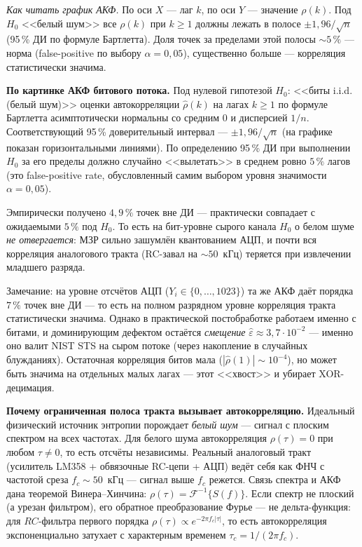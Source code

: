 \documentclass[12pt,a4paper]{extarticle}
\begin{document}
{\emph{Как читать график АКФ.} По оси $X$ --- лаг $k$, по оси $Y$ ---
значение $\rho(k)$. Под $H_0$ <<белый шум>> все $\rho(k)$ при $k\ge 1$
должны лежать в полосе $\pm 1{,}96/\sqrt{n}$ (95\,\% ДИ по формуле
Бартлетта). Доля точек за пределами этой полосы $\sim 5\,\%$ --- норма
(false-positive по выбору $\alpha=0{,}05$), существенно больше ---
корреляция статистически значима.

\medskip
\textbf{По картинке АКФ битового потока.}
Под нулевой гипотезой $H_0$: <<биты i.i.d.\,(белый шум)>> оценки
автокорреляции $\hat\rho(k)$ на лагах $k\ge 1$ по формуле Бартлетта
асимптотически нормальны со средним $0$ и дисперсией $1/n$.
Соответствующий 95\,\% доверительный интервал ---
$\pm 1{,}96/\sqrt{n}$ (на графике показан горизонтальными линиями).
По определению 95\,\% ДИ при выполнении $H_0$ за его пределы
должно случайно <<вылетать>> в среднем ровно $5\,\%$ лагов
(это false-positive rate, обусловленный самим выбором уровня
значимости $\alpha = 0{,}05$).

Эмпирически получено $4{,}9\,\%$ точек вне ДИ --- практически совпадает с
ожидаемыми $5\,\%$ под $H_0$. То есть на бит-уровне сырого канала $H_0$ о
белом шуме \emph{не отвергается}: МЗР сильно зашумлён квантованием АЦП, и
почти вся корреляция аналогового тракта (RC-завал на $\sim\!50$~кГц)
теряется при извлечении младшего разряда.

\medskip
Замечание: на уровне отсчётов АЦП ($Y_i\in\{0,\ldots,1023\}$) та же АКФ даёт
порядка $7\,\%$ точек вне ДИ --- то есть на полном разрядном уровне
корреляция тракта статистически значима. Однако в практической постобработке
работаем именно с битами, и доминирующим дефектом остаётся \emph{смещение}
$\hat\varepsilon\approx 3{,}7\cdot 10^{-2}$ --- именно оно валит NIST STS на
сыром потоке (через накопление в случайных блужданиях). Остаточная
корреляция битов мала ($|\hat\rho(1)|\sim 10^{-4}$), но может быть значима
на отдельных малых лагах --- этот <<хвост>> и убирает XOR-децимация.

\medskip
\textbf{Почему ограниченная полоса тракта вызывает автокорреляцию.}
Идеальный физический источник энтропии порождает \emph{белый шум} ---
сигнал с плоским спектром на всех частотах. Для белого шума автокорреляция
$\rho(\tau) = 0$ при любом $\tau \neq 0$, то есть отсчёты независимы. Реальный
аналоговый тракт (усилитель LM358 + обвязочные RC-цепи + АЦП) ведёт себя как
ФНЧ с частотой среза $f_c\sim 50$~кГц --- сигнал выше $f_c$ режется. Связь
спектра и АКФ дана теоремой Винера--Хинчина:
$\rho(\tau) = \mathcal{F}^{-1}\{S(f)\}$. Если спектр не плоский (а урезан
фильтром), его обратное преобразование Фурье --- не дельта-функция: для
$RC$-фильтра первого порядка $\rho(\tau)\propto e^{-2\pi f_c |\tau|}$, то есть
автокорреляция экспоненциально затухает с характерным временем
$\tau_c = 1/(2\pi f_c)$.

}
\end{document}
